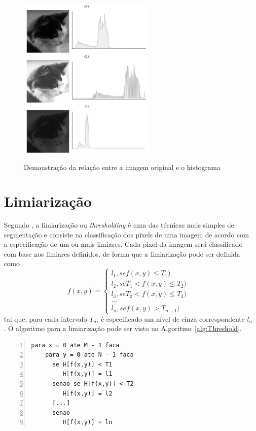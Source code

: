 \documentclass[12pt,oneside,a4paper,english,french,spanish,brazil,]{abntex2}
\begin{document}
\begin{figure}[ht]
\centering
\caption{Demonstração da relação entre a imagem original e o histograma}
\includegraphics[width=0.6\textwidth]{imagens/PDI_Histograma_2.pdf}
\sourceAuthor
\label{fig:PDI_Histograma_2}
\end{figure}

\section{Limiarização}

Segundo \citet{pedrini:2008}, a limiarização ou \textit{thresholding} é uma das técnicas mais simples de segmentação e consiste na classificação dos pixels de uma imagem de acordo com a especificação de um ou mais limiares. Cada pixel da imagem será classificado com base nos limiares definidos, de forma que a limiarização pode ser definida como \[f(x,y)=\left\{\begin{matrix} l_1, se f(x,y) \leq T_1) \\ l_2, se T_1 < f(x,y) \leq T_2)\\ l_3, se T_2 < f(x,y) \leq T_3)\\ ...\\ l_n, se f(x,y) > T_{n-1}) \end{matrix}\right.\] tal que, para cada intervalo \(T_n\), é especificado um nível de cinza correspondente \(l_n\). O algoritmo para a limiarização pode ser visto no Algoritmo~\ref{alg:Threshold}.

\begin{minipage}{\linewidth}
\begin{lstlisting}[caption={Algoritmo para limiarização}, label=alg:Threshold, numbers=left]
para x = 0 ate M - 1 faca
    para y = 0 ate N - 1 faca
      se H[f(x,y)] < T1
         H[f(x,y)] = l1
      senao se H[f(x,y)] < T2
         H[f(x,y)] = l2
      [...]
      senao 
         H[f(x,y)] = ln
\end{lstlisting}
\end{minipage}
\end{document}
